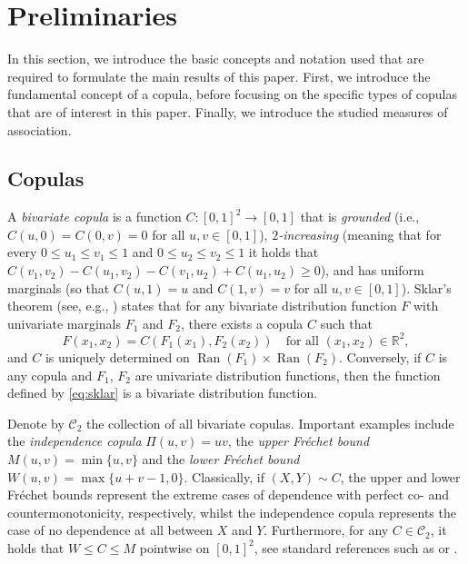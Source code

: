 \documentclass{article}
\theoremstyle{definition}
\newcommand{\CC}{\mathcal{C}}  %
\begin{document}
\section{Preliminaries}
\label{sec:basic_concepts_and_notation} 

In this section, we introduce the basic concepts and notation used that are required to formulate the main results of this paper.
First, we introduce the fundamental concept of a copula, before focusing on the specific types of copulas that are of interest in this paper.
Finally, we introduce the studied measures of association.

\subsection{Copulas}
\label{subsec:copulas}

A \emph{bivariate copula} is a function \(C\colon [0,1]^2 \to [0,1]\) that is \emph{grounded} (i.e., \(C(u,0)=C(0,v)=0\) for all \(u,v\in[0,1]\)), \emph{\(2\)-increasing} (meaning that for every \(0\le u_1\le v_1\le 1\) and \(0\le u_2\le v_2\le 1\) it holds that \(C(v_1,v_2)-C(u_1,v_2)-C(v_1,u_2)+C(u_1,u_2)\ge 0\)), and has uniform marginals (so that \(C(u,1)=u\) and \(C(1,v)=v\) for all \(u,v\in[0,1]\)).
Sklar's theorem (see, e.g., \cite[Theorem~2.3.3]{Nelsen-2006}) states that for any bivariate distribution function \(F\) with univariate marginals \(F_1\) and \(F_2\), there exists a copula \(C\) such that
\begin{equation}\label{eq:sklar}
F(x_1,x_2)=C\left(F_1(x_1),F_2(x_2)\right)\quad \text{for all } (x_1,x_2)\in\mathbb{R}^2,
\end{equation}
and \(C\) is uniquely determined on \(\operatorname{Ran}(F_1) \times \operatorname{Ran}(F_2)\). Conversely, if \(C\) is any copula and \(F_1\), \(F_2\) are univariate distribution functions, then the function defined by \eqref{eq:sklar} is a bivariate distribution function.

Denote by \(\CC_2\) the collection of all bivariate copulas. Important examples include the \emph{independence copula} $\Pi(u,v)=uv$, the \emph{upper Fr\'echet bound} $M(u,v)=\min\{u,v\}$ and the \emph{lower Fr\'echet bound} $W(u,v)=\max\{u+v-1,0\}$.
Classically, if $(X,Y)\sim C$, the upper and lower Fr\'echet bounds represent the extreme cases of dependence with perfect co- and countermonotonicity, respectively, whilst the independence copula represents the case of no dependence at all between $X$ and $Y$.
Furthermore, for any \(C\in\CC_2\), it holds that $W\le C\le M$ pointwise on $[0,1]^2$, see standard references such as \cite{Nelsen-2006} or \cite{Durante-2016}.
\end{document}
